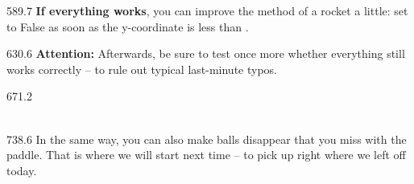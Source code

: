 \documentclass{aslab}
\begin{document}
\begin{region}[pitch=13.6]{589.7}
\textbf{If everything works}, you can improve the  method of a
rocket a little: set  to False as soon as the y-coordinate is less
than .
\end{region}

\begin{region}[pitch=13.4]{630.6}
\textbf{Attention:} Afterwards, be sure to test once more whether everything
still works correctly -- to rule out typical last-minute typos.
\end{region}

\begin{region}[pitch=13.35]{671.2}
\\
\\
\end{region}

\begin{region}[pitch=13.2]{738.6}
In the same way, you can also make balls disappear that you miss with the
paddle. That is where we will start next time -- to pick up right where we
left off today.
\end{region}
\end{document}
